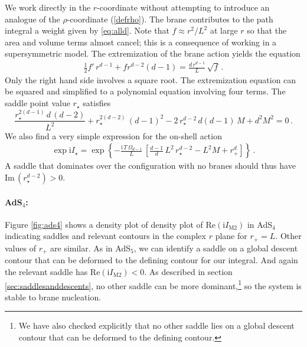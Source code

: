 \documentclass[11pt]{article}
\renewcommand{\i}{\mathrm{i}}
\begin{document}
We work directly in the $r$-coordinate without attempting to introduce an analogue of the $\rho$-coordinate (\ref{defrho}).
The brane contributes to the path integral a weight given by \eqref{eq:alld}.
Note that $f \approx r^2/L^2$ at large $r$ so that the area and volume terms almost cancel; this is a consequence of working in a supersymmetric model.
The extremization of the brane action yields the equation
\begin{align}
    \frac{1}{2} f' \, r^{d-1} + f r^{d-2} (d-1) = \frac{d\,r^{d-1}}{L}\,\sqrt{f}\, .
    \label{exteqf}
\end{align}
Only the right hand side involves a square root.
The extremization equation can be squared and simplified to a polynomial equation involving four terms.
The saddle point value $r_\star$ satisfies
\begin{equation}
    \frac{r_\star^{2(d-1)} \, d\,(d -2)}{L^2} +r_\star^{2(d-2)} \, (d-1)^2 -2\,r_\star^{d-2} \, d(d-1) \, M+ d^2 M^2 = 0\, .
    \label{saddleeqr}
\end{equation}
We also find a very simple expression for the on-shell action
\begin{align}
    \exp \i I_\star = \exp \left\{ - \frac{\i\,T\,\Omega_{d-1}}{L} \,\left[\frac{d-1}{d} \, L^2\,r_\star^{d-2}-L^2 M +r_+^d\right] \right\} \, .
    \label{onshellsimple}
\end{align}
A saddle that dominates over the configuration with no branes should thus have $\text{Im}\, (r_\star^{d-2}) > 0$.

\paragraph{AdS$_4$:}
Figure \ref{fig:ads4}
shows a density plot of density plot of $\mathrm{Re}\left(\i I_{\mathrm{M}2}\right)$ in AdS$_4$ indicating  saddles and relevant contours in the complex $r$ plane for $r_+ = L$. Other values of $r_+$ are similar. As in AdS$_5$, we can identify a saddle on a global descent contour that can be deformed to the defining contour for our integral. And again the relevant saddle has  $\mathrm{Re}\left(\i I_{\mathrm{M}2}\right)<0$.
As described in section \ref{sec:saddlesanddescents}, no other saddle can be more dominant,\footnote{We have also checked explicitly that no other saddle lies on a global descent contour that can be deformed to the defining contour.} so the system is stable to brane nucleation.
\end{document}
